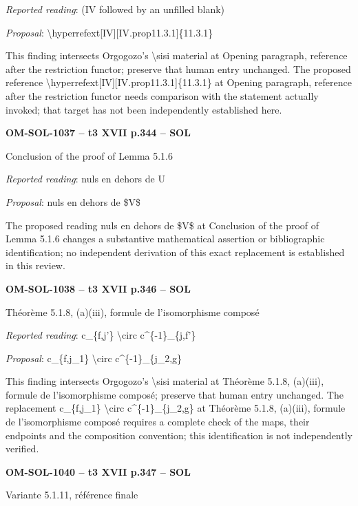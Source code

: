 \emph{Reported reading}: (IV followed by an unfilled blank)\par
\emph{Proposal}: \textbackslash{}hyperrefext[IV][IV.prop11.3.1]\{11.3.1\}\par
This finding intersects Orgogozo's \textbackslash{}sisi material at Opening paragraph, reference after the restriction functor; preserve that human entry unchanged. The proposed reference \textbackslash{}hyperrefext[IV][IV.prop11.3.1]\{11.3.1\} at Opening paragraph, reference after the restriction functor needs comparison with the statement actually invoked; that target has not been independently established here.\par
\par\noindent\textbf{OM-SOL-1037 -- t3 XVII p.344 -- SOL}\par
Conclusion of the proof of Lemma 5.1.6\par
\emph{Reported reading}: nuls en dehors de U\par
\emph{Proposal}: nuls en dehors de \$V\$\par
The proposed reading nuls en dehors de \$V\$ at Conclusion of the proof of Lemma 5.1.6 changes a substantive mathematical assertion or bibliographic identification; no independent derivation of this exact replacement is established in this review.\par
\par\noindent\textbf{OM-SOL-1038 -- t3 XVII p.346 -- SOL}\par
Théorème 5.1.8, (a)(iii), formule de l’isomorphisme composé\par
\emph{Reported reading}: c\_\{f,j'\} \textbackslash{}circ c\textasciicircum{}\{-1\}\_\{j,f'\}\par
\emph{Proposal}: c\_\{f,j\_1\} \textbackslash{}circ c\textasciicircum{}\{-1\}\_\{j\_2,g\}\par
This finding intersects Orgogozo's \textbackslash{}sisi material at Théorème 5.1.8, (a)(iii), formule de l’isomorphisme composé; preserve that human entry unchanged. The replacement c\_\{f,j\_1\} \textbackslash{}circ c\textasciicircum{}\{-1\}\_\{j\_2,g\} at Théorème 5.1.8, (a)(iii), formule de l’isomorphisme composé requires a complete check of the maps, their endpoints and the composition convention; this identification is not independently verified.\par
\par\noindent\textbf{OM-SOL-1040 -- t3 XVII p.347 -- SOL}\par
Variante 5.1.11, référence finale\par

